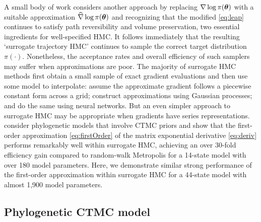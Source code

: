 \documentclass[12pt]{article} %
\begin{document}
A small body of work considers another approach by replacing $\nabla \log \pi (\boldsymbol{\theta})$ with a suitable approximation $\widehat{\nabla} \log \pi (\boldsymbol{\theta})$ and recognizing that the modified \eqref{eq:leap} continues to satisfy path reversibility and volume preservation, two essential ingredients for well-specified HMC. It follows immediately that the resulting `surrogate trajectory HMC' continues to sample the correct target distribution $\pi(\cdot)$.  Nonetheless, the acceptance rates and overall efficiency of such samplers may suffer when approximations are poor.   The majority of surrogate HMC methods first obtain a small sample of exact gradient evaluations and then use some model to interpolate: \citet{zhang2017precomputing} assume the approximate gradient follows a piecewise constant form across a grid; \citet{rasmussen2003gaussian,lan2016emulation} construct approximations using Gaussian processes; and \citet{zhang2017hamiltonian,li2019neural} do the same using neural networks.  But an even simpler approach to surrogate HMC may be appropriate when gradients have series representations.   \citet{magee2023random} consider phylogenetic models that involve CTMC priors and show that the first-order approximation \eqref{eq:firstOrder} of the matrix exponential derivative \eqref{eq:deriv} performs remarkably well within surrogate HMC, achieving an over 30-fold efficiency gain compared to random-walk Metropolis for a 14-state model with over 180 model parameters.  Here, we demonstrate similar strong performance of the first-order approximation within surrogate HMC for a 44-state model with almost 1,900 model parameters.  



\subsection{Phylogenetic CTMC model}
\end{document}
